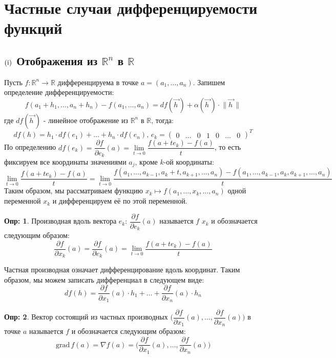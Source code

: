 \documentclass[12pt]{article}
\newcommand{\RN}[1]{%
	\textup{\uppercase\expandafter{\romannumeral#1}}%
}
\newcommand{\MR}{\mathbb{R}}
\theoremstyle{definition}
\newtheorem{defn}{Опр:}
\begin{document}
\section*{Частные случаи дифференцируемости функций}
\subsection*{$(\RN{1})$ Отображения из $\MR^n$ в $\MR$}
Пусть $f \colon \MR^n \to \MR$ дифференцируема в точке $a = (a_1, \dotsc, a_n)$. Запишем определение дифференцируемости:
$$
	f(a_1 + h_1, \dotsc, a_n + h_n) - f(a_1, \dotsc, a_n) = df(\overrightarrow{h\,}) + \alpha(\overrightarrow{h\,}){\cdot}{\|\overrightarrow{h\,}\|}
$$
где $df(\overrightarrow{h\,})$ - линейное отображение из $\MR^n$ в $\MR$, тогда: 
$$
	df(h) = h_1 {\cdot} df(e_1) + \dotsc + h_n {\cdot} df(e_n), \, e_k = \begin{pmatrix} 0 &	\dotsc & 0 & 1 & 0 & \dotsc & 0 \end{pmatrix}^T
$$ 
По определению $df(e_k) = \dfrac{\partial f}{\partial e_k}(a) = \lim\limits_{t \to 0} \dfrac{f(a + te_k) - f(a)}{t}$, то есть фиксируем все координаты значениями $a_j$, кроме $k$-ой координаты:
$$
	\lim\limits_{t \to 0} \dfrac{f(a + te_k) - f(a)}{t} = \lim\limits_{t \to 0} \dfrac{f(a_1, \dotsc,a_{k-1}, a_k + t, a_{k+1}, \dotsc, a_n) - f(a_1, \dotsc,a_{k-1}, a_k, a_{k+1}, \dotsc, a_n)}{t}
$$
Таким образом, мы рассматриваем функцию $x_k \mapsto f(a_1,\dotsc, x_k,\dotsc, a_n)$ одной переменной $x_k$ и дифференцируем её по этой переменной.

\begin{defn}
	Производная вдоль вектора $e_k$: $\dfrac{\partial f}{\partial e_k}(a)$ называется  $f$  $x_k$  и обозначается следующим образом: 
	$$
		\dfrac{\partial f}{\partial x_k}(a) = \dfrac{\partial f}{\partial e_k}(a) = \lim\limits_{t \to 0} \dfrac{f(a + te_k) - f(a)}{t}
	$$
\end{defn}

Частная производная означает дифференцирование вдоль координат. Таким образом, мы можем записать дифференциал в следующем виде:
$$
	df(h) =  \dfrac{\partial f}{\partial x_1}(a){\cdot}h_1 + \dotsc + \dfrac{\partial f}{\partial x_n}(a){\cdot} h_n
$$
\begin{defn}
	Вектор состоящий из частных производных $\Big(\dfrac{\partial f}{\partial x_1}(a), \dotsc, \dfrac{\partial f}{\partial x_n}(a)\Big)$ в точке $a$ называется  $f$ и обозначается следующим образом: 
	$$
		\text{grad}\, f(a) = \nabla f(a) = \Big(\dfrac{\partial f}{\partial x_1}(a), \dotsc, \dfrac{\partial f}{\partial x_n}(a)\Big)
	$$
\end{defn}
\end{document}
